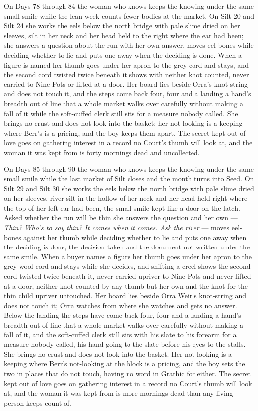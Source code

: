 \documentclass{design/chronicle}
\begin{document}
{On Days 78 through 84 the woman who knows keeps the knowing under the same small smile while the lean week counts fewer bodies at the market. On Silt 20 and Silt 24 she works the eels below the north bridge with pale slime dried on her sleeves, silt in her neck and her head held to the right where the ear had been; she answers a question about the run with her own answer, moves eel-bones while deciding whether to lie and puts one away when the deciding is done. When a figure is named her thumb goes under her apron to the grey cord and stays, and the second cord twisted twice beneath it shows with neither knot counted, never carried to Nine Pots or lifted at a door. Her board lies beside Orra’s knot-string and does not touch it, and the steps come back four, four and a landing a hand’s breadth out of line that a whole market walks over carefully without making a fall of it while the soft-cuffed clerk still sits for a measure nobody called. She brings no crust and does not look into the basket; her not-looking is a keeping where Berr’s is a pricing, and the boy keeps them apart. The secret kept out of love goes on gathering interest in a record no Court’s thumb will look at, and the woman it was kept from is forty mornings dead and uncollected.

On Days 85 through 90 the woman who knows keeps the knowing under the same small smile while the last market of Silt closes and the month turns into Seed. On Silt 29 and Silt 30 she works the eels below the north bridge with pale slime dried on her sleeves, river silt in the hollow of her neck and her head held right where the top of her left ear had been, the small smile kept like a door on the latch. Asked whether the run will be thin she answers the question and her own --- \emph{Thin? Who’s to say thin? It comes when it comes. Ask the river} --- moves eel-bones against her thumb while deciding whether to lie and puts one away when the deciding is done, the decision taken and the document not written under the same smile. When a buyer names a figure her thumb goes under her apron to the grey wool cord and stays while she decides, and shifting a creel shows the second cord twisted twice beneath it, never carried upriver to Nine Pots and never lifted at a door, neither knot counted by any thumb but her own and the knot for the thin child upriver untouched. Her board lies beside Orra Weir’s knot-string and does not touch it; Orra watches from where she watches and gets no answer. Below the landing the steps have come back four, four and a landing a hand’s breadth out of line that a whole market walks over carefully without making a fall of it, and the soft-cuffed clerk still sits with his slate to his forearm for a measure nobody called, his hand going to the slate before his eyes to the stalls. She brings no crust and does not look into the basket. Her not-looking is a keeping where Berr’s not-looking at the block is a pricing, and the boy sets the two in places that do not touch, having no word in Grathic for either. The secret kept out of love goes on gathering interest in a record no Court’s thumb will look at, and the woman it was kept from is more mornings dead than any living person keeps count of.

}
\end{document}
